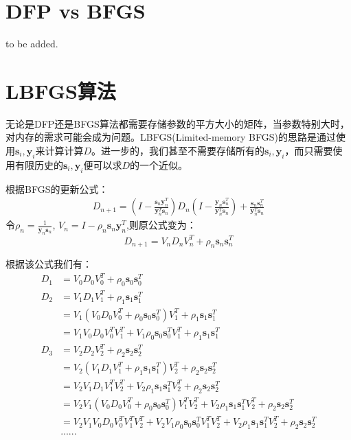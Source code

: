 \section{DFP vs BFGS}
to be added.

\section{LBFGS算法}
无论是DFP还是BFGS算法都需要存储参数的平方大小的矩阵，当参数特别大时，对内存的需求可能会成为问题。LBFGS(Limited-memory BFGS)的思路是通过使用${\mathbf{s}_i},{\mathbf{y}_i}$来计算计算$D$。进一步的，我们甚至不需要存储所有的${\mathbf{s}_i},{\mathbf{y}_i}$，而只需要使用有限历史的${\mathbf{s}_i},{\mathbf{y}_i}$便可以求$D$的一个近似。

根据BFGS的更新公式：
\begin{displaymath}
\begin{split}
D_{n+1} = \left( I- \frac{\mathbf{s}_n\mathbf{y}_n^T}{\mathbf{y}_n^T\mathbf{s}_n} \right) D_n \left( I- \frac{\mathbf{y}_n\mathbf{s}_n^T}{\mathbf{y}_n^T\mathbf{s}_n} \right) +\frac{\mathbf{s}_n\mathbf{s}_n^T}{\mathbf{y}_n^T\mathbf{s}_n}
\end{split}
\end{displaymath}
令$\rho_n=\frac{1}{\mathbf{y}_n\mathbf{s}_n}$, $V_n = I-\rho_n\mathbf{s}_n\mathbf{y}_n^T$,则原公式变为：
\begin{displaymath}
D_{n+1}=V_nD_nV_n^T+\rho_n\mathbf{s}_n\mathbf{s}_n^T
\end{displaymath}

根据该公式我们有：
\begin{displaymath}
\begin{split}
D_1&=V_0D_0V_0^T+\rho_0\mathbf{s}_0\mathbf{s}_0^T\\
D_2&=V_1D_1V_1^T+\rho_1\mathbf{s}_1\mathbf{s}_1^T\\
   &=V_1(V_0D_0V_0^T+\rho_0\mathbf{s}_0\mathbf{s}_0^T)V_1^T+\rho_1\mathbf{s}_1\mathbf{s}_1^T\\
   &=V_1V_0D_0V_0^TV_1^T+V_1\rho_0\mathbf{s}_0\mathbf{s}_0^TV_1^T+\rho_1\mathbf{s}_1\mathbf{s}_1^T\\
D_3&=V_2D_2V_2^T+\rho_2\mathbf{s}_2\mathbf{s}_2^T\\
   &=V_2(V_1D_1V_1^T+\rho_1\mathbf{s}_1\mathbf{s}_1^T)V_2^T+\rho_2\mathbf{s}_2\mathbf{s}_2^T\\
   &=V_2V_1D_1V_1^TV_2^T+V_2\rho_1\mathbf{s}_1\mathbf{s}_1^TV_2^T+\rho_2\mathbf{s}_2\mathbf{s}_2^T\\
   &=V_2V_1(V_0D_0V_0^T+\rho_0\mathbf{s}_0\mathbf{s}_0^T)V_1^TV_2^T+V_2\rho_1\mathbf{s}_1\mathbf{s}_1^TV_2^T+\rho_2\mathbf{s}_2\mathbf{s}_2^T\\
   &=V_2V_1V_0D_0V_0^TV_1^TV_2^T+V_2V_1\rho_0\mathbf{s}_0\mathbf{s}_0^TV_1^TV_2^T+V_2\rho_1\mathbf{s}_1\mathbf{s}_1^TV_2^T+\rho_2\mathbf{s}_2\mathbf{s}_2^T\\
  &... ...
\end{split}
\end{displaymath}

